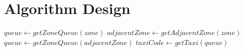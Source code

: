 \section{Algorithm Design}
\begin{algorithmic}
		\State $queue\gets getZoneQueue(zone)$
				\State $adjacentZone \gets getAdjacentZone(zone)$
				\State $queue\gets getZoneQueue(adjacentZone)$
		\EndWhile
		\State $taxiCode \gets getTaxi(queue)$
		\State {}
	\EndFunction
\end{algorithmic}